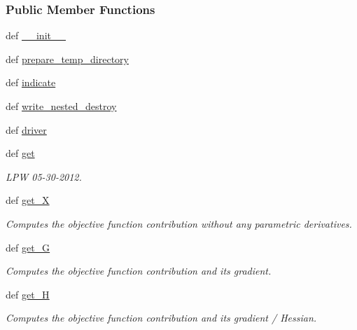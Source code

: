 \subsubsection*{Public Member Functions}
\begin{DoxyCompactItemize}
\item 
def \hyperlink{classforcebalance_1_1psi4io_1_1THCDF__Psi4_a902a91bfce7a9e4eee2501a2b5feda44}{\-\_\-\-\_\-init\-\_\-\-\_\-}
\item 
def \hyperlink{classforcebalance_1_1psi4io_1_1THCDF__Psi4_aaaa58c83926697adacd34c31af342fc8}{prepare\-\_\-temp\-\_\-directory}
\item 
def \hyperlink{classforcebalance_1_1psi4io_1_1THCDF__Psi4_a2fd5e08b9c214fc374167a029270be99}{indicate}
\item 
def \hyperlink{classforcebalance_1_1psi4io_1_1THCDF__Psi4_ae4389941b46ce11689f45115fdb61b39}{write\-\_\-nested\-\_\-destroy}
\item 
def \hyperlink{classforcebalance_1_1psi4io_1_1THCDF__Psi4_a14993bd872840bd869fefced495e7ba2}{driver}
\item 
def \hyperlink{classforcebalance_1_1leastsq_1_1LeastSquares_a2010f34730d88209b738d557cca09a1c}{get}
\begin{DoxyCompactList}\small\item\em L\-P\-W 05-\/30-\/2012. \end{DoxyCompactList}\item 
def \hyperlink{classforcebalance_1_1target_1_1Target_a606dd136f195c267c05a2455405e5949}{get\-\_\-\-X}
\begin{DoxyCompactList}\small\item\em Computes the objective function contribution without any parametric derivatives. \end{DoxyCompactList}\item 
def \hyperlink{classforcebalance_1_1target_1_1Target_afa8cc38c8bba8861c072e789717aa049}{get\-\_\-\-G}
\begin{DoxyCompactList}\small\item\em Computes the objective function contribution and its gradient. \end{DoxyCompactList}\item 
def \hyperlink{classforcebalance_1_1target_1_1Target_a1d2ee27fe86a09769c1816af23b09adb}{get\-\_\-\-H}
\begin{DoxyCompactList}\small\item\em Computes the objective function contribution and its gradient / Hessian. \end{DoxyCompactList}\item 

\end{DoxyCompactItemize}
